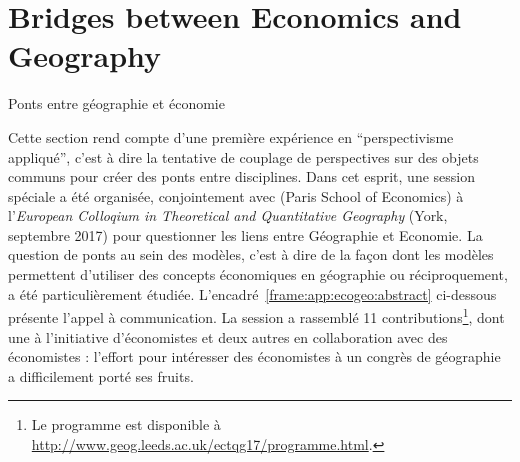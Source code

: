 



\newpage

\section{Bridges between Economics and Geography}{Ponts entre géographie et économie}


\label{app:sec:ecogeo}


Cette section rend compte d'une première expérience en ``perspectivisme appliqué'', c'est à dire la tentative de couplage de perspectives sur des objets communs pour créer des ponts entre disciplines. Dans cet esprit, une session spéciale a été organisée, conjointement avec  (Paris School of Economics) à l'\emph{European Colloqium in Theoretical and Quantitative Geography} (York, septembre 2017) pour questionner les liens entre Géographie et Economie. La question de ponts au sein des modèles, c'est à dire de la façon dont les modèles permettent d'utiliser des concepts économiques en géographie ou réciproquement, a été particulièrement étudiée. L'encadré~\ref{frame:app:ecogeo:abstract} ci-dessous présente l'appel à communication. La session a rassemblé 11 contributions\footnote{Le programme est disponible à \url{http://www.geog.leeds.ac.uk/ectqg17/programme.html}.}, dont une à l'initiative d'économistes et deux autres en collaboration avec des économistes : l'effort pour intéresser des économistes à un congrès de géographie a difficilement porté ses fruits.


